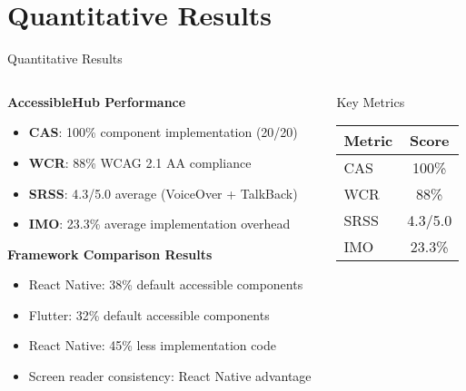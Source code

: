 \documentclass[10pt,aspectratio=169]{beamer}
\begin{document}
\section{Quantitative Results}

\begin{frame}{Quantitative Results}
    \begin{columns}[c]
        \begin{column}{0.6\textwidth}
            \textbf{AccessibleHub Performance}
            \begin{itemize}
                \item \textbf{CAS}: 100\% component implementation (20/20)
                \item \textbf{WCR}: 88\% WCAG 2.1 AA compliance
                \item \textbf{SRSS}: 4.3/5.0 average (VoiceOver + TalkBack)
                \item \textbf{IMO}: 23.3\% average implementation overhead
            \end{itemize}
            
            \vspace{0.5cm}
            
            \textbf{Framework Comparison Results}
            \begin{itemize}
                \item React Native: 38\% default accessible components
                \item Flutter: 32\% default accessible components
                \item React Native: 45\% less implementation code
                \item Screen reader consistency: React Native advantage
            \end{itemize}
        \end{column}
        \begin{column}{0.35\textwidth}
            \begin{block}{Key Metrics}
                \begin{tabular}{|l|c|}
                    \hline
                    \textbf{Metric} & \textbf{Score} \\
                    \hline
                    CAS & 100\% \\
                    WCR & 88\% \\
                    SRSS & 4.3/5.0 \\
                    IMO & 23.3\% \\
                    \hline
                \end{tabular}
            \end{block}
        \end{column}
    \end{columns}
\end{frame}
\end{document}
